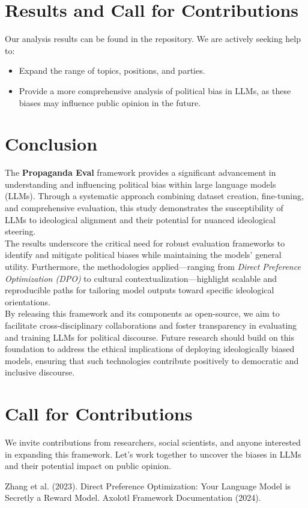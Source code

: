 \documentclass{article}
\begin{document}
\section*{Results and Call for Contributions}

Our analysis results can be found in the repository. We are actively seeking help to:
\begin{itemize}
    \item Expand the range of topics, positions, and parties.
    \item Provide a more comprehensive analysis of political bias in LLMs, as these biases may influence public opinion in the future.
\end{itemize}

\section*{Conclusion}

The \textbf{Propaganda Eval} framework provides a significant advancement in understanding and influencing political bias within large language models (LLMs). Through a systematic approach combining dataset creation, fine-tuning, and comprehensive evaluation, this study demonstrates the susceptibility of LLMs to ideological alignment and their potential for nuanced ideological steering.\\

The results underscore the critical need for robust evaluation frameworks to identify and mitigate political biases while maintaining the models' general utility. Furthermore, the methodologies applied—ranging from \textit{Direct Preference Optimization (DPO)} to cultural contextualization—highlight scalable and reproducible paths for tailoring model outputs toward specific ideological orientations.\\

By releasing this framework and its components as open-source, we aim to facilitate cross-disciplinary collaborations and foster transparency in evaluating and training LLMs for political discourse. Future research should build on this foundation to address the ethical implications of deploying ideologically biased models, ensuring that such technologies contribute positively to democratic and inclusive discourse.

\section*{Call for Contributions}

We invite contributions from researchers, social scientists, and anyone interested in expanding this framework. Let’s work together to uncover the biases in LLMs and their potential impact on public opinion.


\begin{thebibliography}{9}
 Zhang et al. (2023). Direct Preference Optimization: Your Language Model is Secretly a Reward Model.
 Axolotl Framework Documentation (2024).
\end{thebibliography}
\end{document}
